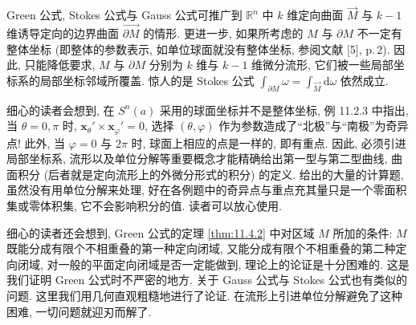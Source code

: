 \begin{figure}[htbp]
  \centering
  \caption{}\label{fig:11.4.16}
\end{figure}

Green 公式, Stokes 公式与 Gauss 公式可推广到 $\mathbb{R}^{n}$ 中 $k$ 维定向曲面 $\overrightarrow{M}$ 与 $k-1$ 维诱导定向的边界曲面 $\overrightarrow{\partial M}$ 的情形. 更进一步, 如果所考虑的 $M$ 与 $\partial M$ 不一定有整体坐标 (即整体的参数表示, 如单位球面就没有整体坐标, 参阅文献 [5], p.\,2). 因此, 只能降低要求, $M$ 与 $\partial M$ 分别为 $k$ 维与 $k-1$ 维微分流形, 它们被一些局部坐标系的局部坐标邻域所覆盖. 惊人的是 Stokes 公式 $\int_{\partial M}\omega=\int_{\overrightarrow{M}}\mathrm{d}\omega$ 依然成立.

细心的读者会想到, 在 $S^{n}(a)$ 采用的球面坐标并不是整体坐标, 例 11.2.3 中指出, 当 $\theta=0,\pi$ 时, $\boldsymbol{x}_{\theta}'\times\boldsymbol{x}_{\varphi}'=0$, 选择 $(\theta,\varphi)$ 作为参数造成了``北极''与``南极''为奇异点! 此外, 当 $\varphi=0$ 与 $2\pi$ 时, 球面上相应的点是一样的, 即有重点. 因此, 必须引进局部坐标系, 流形以及单位分解等重要概念才能精确给出第一型与第二型曲线, 曲面积分 (后者就是定向流形上的外微分形式的积分) 的定义. 给出的大量的计算题, 虽然没有用单位分解来处理, 好在各例题中的奇异点与重点充其量只是一个零面积集或零体积集, 它不会影响积分的值. 读者可以放心使用.

细心的读者还会想到, Green 公式的定理 \cref{thm:11.4.2} 中对区域 $M$ 所加的条件: $M$ 既能分成有限个不相重叠的第一种定向闭域, 又能分成有限个不相重叠的第二种定向闭域, 对一般的平面定向闭域是否一定能做到, 理论上的论证是十分困难的. 这是我们证明 Green 公式时不严密的地方. 关于 Gauss 公式与 Stokes 公式也有类似的问题. 这里我们用几何直观粗糙地进行了论证. 在流形上引进单位分解避免了这种困难, 一切问题就迎刃而解了.

